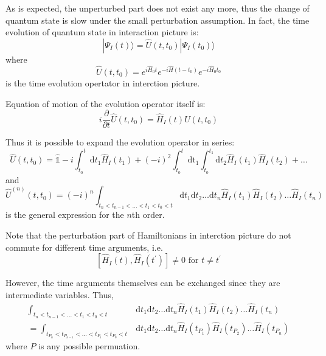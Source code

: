 As is expected, the unperturbed part does not exist any more, thus the change of quantum state is slow under the small perturbation assumption.
In fact, the time evolution of quantum state in interaction picture is:
\begin{equation}
| \Psi_{I}(t) \rangle=\hat{U}\left(t, t_{0}\right) | \Psi_{I}\left(t_{0}\right) \rangle
\end{equation}
where
\begin{equation}
\hat{U}\left(t, t_{0}\right)=e^{i \hat{H}_{0} t} e^{-i \hat{H}\left(t-t_{0}\right)} e^{-i \hat{H}_{0} t_{0}}
\end{equation}
is the time evolution opertator in interction picture.

Equation of motion of the evolution operator itself is:
\begin{equation}
i \frac{\partial}{\partial t} \hat{U}\left(t, t_{0}\right)=\hat{H}_{I}(t) U\left(t, t_{0}\right)
\end{equation}

Thus it is possible to expand the evolution operator in series:
\begin{equation}
\hat{U}\left(t, t_{0}\right)=\hat{\mathbb{1}}-i \int_{t_{0}}^{t} \mathrm{d} t_{1} \hat{H}_{I}\left(t_{1}\right)+(-i)^{2} \int_{t_{0}}^{t} \mathrm{dt}_{1} \int_{t_{0}}^{t_{1}} \mathrm{d} t_{2} \hat{H}_{I}\left(t_{1}\right) \hat{H}_{I}\left(t_{2}\right)+\ldots
\end{equation}
and
\begin{equation}
\hat{U}^{(n)}\left(t, t_{0}\right)=
(-i)^{n} \int_{t_n<t_{n-1}<\dots<t_1<t_0<t} \mathrm{d} t_{1} \mathrm{d} t_{2} \ldots \mathrm{d} t_{n} \hat{H}_{I}\left(t_{1}\right) \hat{H}_{I}\left(t_{2}\right) \ldots \hat{H}_{I}\left(t_{n}\right)
\end{equation}
is the general expression for the $n$th order.

Note that the perturbation part of Hamiltonians in interction picture do not commute for different time arguments, i.e.
\begin{equation}
\left[\hat{H}_{I}(t), \hat{H}_{I}\left(t^{\prime}\right)\right] \neq 0 \text { for } t \neq t^{\prime}
\end{equation}

However, the time arguments themselves can be exchanged since they are intermediate variables.
Thus,
\begin{equation}
\begin{aligned}
	\int_{t_n<t_{n-1}<\dots<t_1<t_0<t} &\mathrm{d} t_{1} \mathrm{d} t_{2} \ldots \mathrm{d} t_{n} \hat{H}_{I}\left(t_{1}\right) \hat{H}_{I}\left(t_{2}\right) \ldots \hat{H}_{I}\left(t_{n}\right)
	\\
	=\int_{t_{P_n}<t_{P_{n-1}}<\dots<t_{P_1}<t_{P_0}<t} &\mathrm{d} t_{1} \mathrm{d} t_{2} \ldots \mathrm{d} t_{n} \hat{H}_{I}\left(t_{P_1}\right) \hat{H}_{I}\left(t_{P_2}\right) \ldots \hat{H}_{I}\left(t_{P_n}\right)
\end{aligned}
\end{equation}
where $P$ is any possible permuation.

